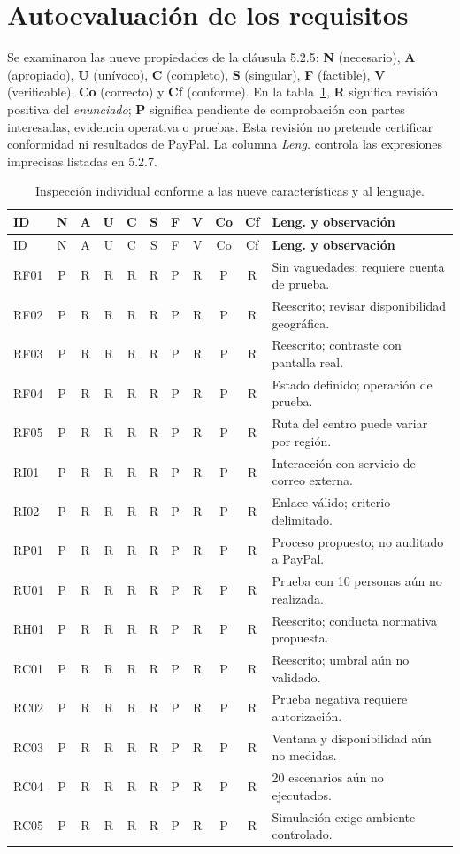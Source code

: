 \documentclass[10pt,a4paper]{extarticle}
\begin{document}
\section{Autoevaluación de los requisitos}
Se examinaron las nueve propiedades de la cláusula 5.2.5: \textbf{N} (necesario), \textbf{A} (apropiado), \textbf{U} (unívoco), \textbf{C} (completo), \textbf{S} (singular), \textbf{F} (factible), \textbf{V} (verificable), \textbf{Co} (correcto) y \textbf{Cf} (conforme). En la tabla~\ref{tab:revision}, \textbf{R} significa revisión positiva del \emph{enunciado}; \textbf{P} significa pendiente de comprobación con partes interesadas, evidencia operativa o pruebas. Esta revisión no pretende certificar conformidad ni resultados de PayPal. La columna \emph{Leng.} controla las expresiones imprecisas listadas en 5.2.7.
\begingroup\scriptsize
\begin{longtable}{@{}l*{9}{c}p{5.3cm}@{}}
\caption{Inspección individual conforme a las nueve características y al lenguaje.}\label{tab:revision}\\
\toprule ID&N&A&U&C&S&F&V&Co&Cf&\textbf{Leng. y observación}\\\midrule\endfirsthead
\toprule ID&N&A&U&C&S&F&V&Co&Cf&\textbf{Leng. y observación}\\\midrule\endhead
RF01&P&R&R&R&R&P&R&P&R&Sin vaguedades; requiere cuenta de prueba.\\
RF02&P&R&R&R&R&P&R&P&R&Reescrito; revisar disponibilidad geográfica.\\
RF03&P&R&R&R&R&P&R&P&R&Reescrito; contraste con pantalla real.\\
RF04&P&R&R&R&R&P&R&P&R&Estado definido; operación de prueba.\\
RF05&P&R&R&R&R&P&R&P&R&Ruta del centro puede variar por región.\\
RI01&P&R&R&R&R&P&R&P&R&Interacción con servicio de correo externa.\\
RI02&P&R&R&R&R&P&R&P&R&Enlace válido; criterio delimitado.\\
RP01&P&R&R&R&R&P&R&P&R&Proceso propuesto; no auditado a PayPal.\\
RU01&P&R&R&R&R&P&R&P&R&Prueba con 10 personas aún no realizada.\\
RH01&P&R&R&R&R&P&R&P&R&Reescrito; conducta normativa propuesta.\\
RC01&P&R&R&R&R&P&R&P&R&Reescrito; umbral aún no validado.\\
RC02&P&R&R&R&R&P&R&P&R&Prueba negativa requiere autorización.\\
RC03&P&R&R&R&R&P&R&P&R&Ventana y disponibilidad aún no medidas.\\
RC04&P&R&R&R&R&P&R&P&R&20 escenarios aún no ejecutados.\\
RC05&P&R&R&R&R&P&R&P&R&Simulación exige ambiente controlado.\\
\bottomrule
\end{longtable}
\end{document}
